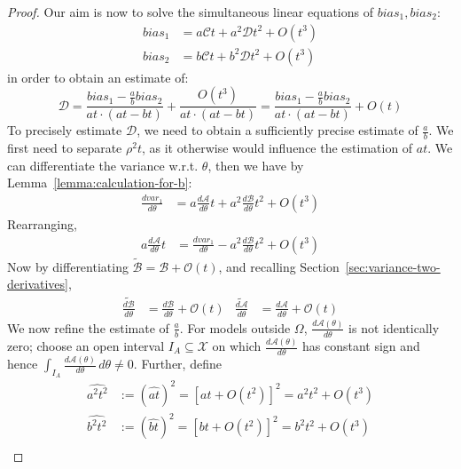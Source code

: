 \begin{proof}
Our aim is now to solve the simultaneous linear equations of $bias_1, bias_2$:
    \begin{align*}
        bias_1 &= a\mathcal{C}t + a^2\mathcal{D}t^2 + O(t^3)\\
        bias_2 &= b\mathcal{C}t + b^2\mathcal{D}t^2 + O(t^3)
    \end{align*}
in order to obtain an estimate of:
\begin{equation*}
    \mathcal{D} = \frac{bias_1 - \frac{a}{b}bias_2}{at \cdot (at - bt)} + \frac{O(t^3)}{at \cdot (at - bt)} = \frac{bias_1 - \frac{a}{b}bias_2}{at \cdot (at - bt)} + O(t)
\end{equation*}
To precisely estimate $\mathcal{D}$, we need to obtain a sufficiently precise estimate of  $\frac{a}{b}$. We first need to separate $\rho^2t$, as it otherwise would influence the estimation of $at$. 
We can differentiate the variance w.r.t. $\theta$, then we have by Lemma~\ref{lemma:calculation-for-b}:
\begin{align*}
    \frac{d var_1}{d \theta} &= a\frac{d \mathcal{A}}{d \theta}t + a^2 \frac{d \mathcal{B}}{d \theta} t^2 + O(t^3)
    \end{align*}
Rearranging,
    \begin{align*}
    a\frac{d \mathcal{A}}{d \theta}t &= \frac{d var_1}{d \theta} - a^2\frac{d \mathcal{B}}{d \theta} t^2 + O(t^3)
    \end{align*}
    Now by differentiating $\tilde{\mathcal{B}} = \mathcal{B} + \mathcal{O}(t)$, and recalling Section~\ref{sec:variance-two-derivatives},
    \begin{align*}
    \tilde{\frac{d \mathcal{B}}{d \theta}} &= \frac{d \mathcal{B}}{d \theta} + \mathcal{O}(t) &
    \tilde{\frac{d \mathcal{A}}{d \theta}} &= \frac{d \mathcal{A}}{d \theta} + \mathcal{O}(t)
    \end{align*}
    We now refine the estimate of \(\frac{a}{b}\). For models outside $\Omega$, \(\frac{d \mathcal A(\theta)}{d\theta}\) is not identically zero; choose an open interval \(I_A\subseteq\mathcal X\) on which \(\frac{d \mathcal A(\theta)}{d\theta}\) has constant sign and hence \(\int_{I_A}\frac{d \mathcal A(\theta)}{d\theta}\,d\theta\neq 0\).
    Further, define
    \begin{align*}
    \widehat{a^2t^2} &:= \left(\widehat{at}\right)^2 = \left[at + O(t^2)\right]^2 = a^2t^2 + O(t^3) \\
    \widehat{b^2t^2} &:= \left(\widehat{bt}\right)^2 = \left[bt + O(t^2)\right]^2 = b^2t^2 + O(t^3) \\

\end{align*}
\end{proof}
